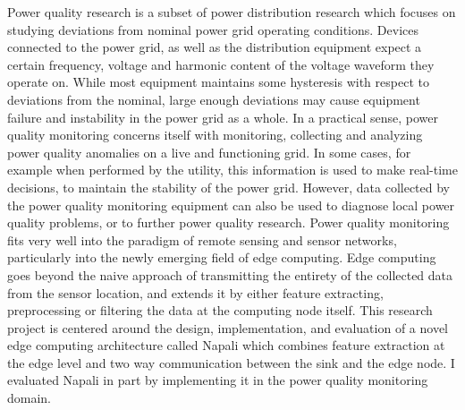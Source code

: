 Power quality research is a subset of power distribution research which focuses on studying  deviations from nominal power grid operating conditions.
Devices connected to the power grid, as well as the distribution equipment expect a certain frequency, voltage and harmonic content of the voltage waveform they operate on.
While most equipment maintains some hysteresis with respect to deviations from the nominal, large enough deviations may cause equipment failure and instability in the power grid as a whole.
In a practical sense, power quality monitoring concerns itself with monitoring, collecting and analyzing power quality anomalies on a live and functioning grid.
In some cases, for example when performed by the utility, this information is used to make real-time decisions, to maintain the stability of the power grid.
However, data collected by the power quality monitoring equipment can also be used to diagnose local power quality problems, or to further power quality research.
Power quality monitoring fits very well into the paradigm of remote sensing and sensor networks, particularly into the newly emerging field of edge computing.
Edge computing goes beyond the naive approach of transmitting the entirety of the collected data from the sensor location, and extends it by either feature extracting, preprocessing or filtering the data at the computing node itself.
This research project is centered around the design, implementation, and evaluation of a novel edge computing architecture called Napali which combines feature extraction at the edge level and two way communication between the sink and the edge node.
I evaluated Napali in part by implementing it in the power quality monitoring domain.

